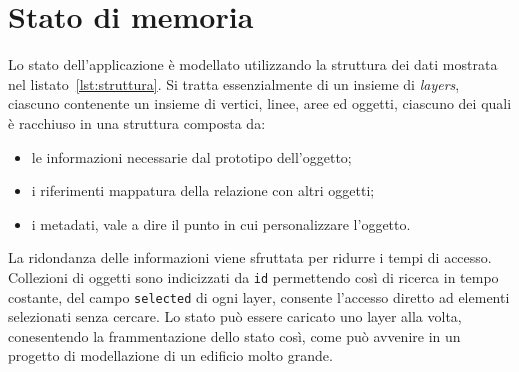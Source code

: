 \newpage
\section{Stato di memoria}
\label{sec:chapter_2_section_2}

Lo stato dell'applicazione è modellato utilizzando la struttura dei dati mostrata nel listato~\ref{lst:struttura}.
Si tratta essenzialmente di un insieme di \emph{layers}, ciascuno contenente un insieme di vertici, linee, aree
ed oggetti, ciascuno dei quali è racchiuso in una struttura composta da:
\begin{itemize}
\item le informazioni necessarie dal prototipo dell'oggetto;
\item i riferimenti mappatura della relazione con altri oggetti;
\item i metadati, vale a dire il punto in cui personalizzare l'oggetto.
\end{itemize}
La ridondanza delle informazioni viene sfruttata per ridurre i tempi di accesso. Collezioni di oggetti
sono indicizzati da \texttt{id} permettendo così di ricerca in tempo costante, del
campo \texttt{selected} di ogni layer, consente l'accesso diretto ad elementi selezionati senza cercare.
Lo stato può essere caricato uno layer alla volta, conesentendo la frammentazione dello stato così,
come può avvenire in un progetto di modellazione di un edificio molto grande.


